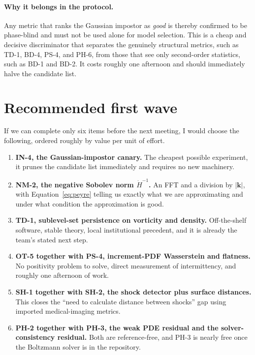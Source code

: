 \documentclass[11pt]{article}
\begin{document}
\paragraph{Why it belongs in the protocol.} Any metric that ranks the Gaussian impostor as
\emph{good} is thereby confirmed to be phase-blind and must not be used alone for model
selection. This is a cheap and decisive discriminator that separates the genuinely structural
metrics, such as TD-1, BD-4, PS-4, and PH-6, from those that see only second-order
statistics, such as BD-1 and BD-2. It costs roughly one afternoon and should immediately
halve the candidate list.

\section{Recommended first wave}

If we can complete only six items before the next meeting, I would choose the following,
ordered roughly by value per unit of effort.

\begin{enumerate}[leftmargin=*]
\item \textbf{IN-4, the Gaussian-impostor canary.} The cheapest possible experiment, it
prunes the candidate list immediately and requires no new machinery.
\item \textbf{NM-2, the negative Sobolev norm $\dot H^{-1}$.} An FFT and a division by
$|\mathbf{k}|$, with Equation~\eqref{eq:peyre} telling us exactly what we are approximating
and under what condition the approximation is good.
\item \textbf{TD-1, sublevel-set persistence on vorticity and density.} Off-the-shelf
software, stable theory, local institutional precedent, and it is already the team's stated
next step.
\item \textbf{OT-5 together with PS-4, increment-PDF Wasserstein and flatness.} No positivity
problem to solve, direct measurement of intermittency, and roughly one afternoon of work.
\item \textbf{SH-1 together with SH-2, the shock detector plus surface distances.} This
closes the ``need to calculate distance between shocks'' gap using imported medical-imaging
metrics.
\item \textbf{PH-2 together with PH-3, the weak PDE residual and the solver-consistency
residual.} Both are reference-free, and PH-3 is nearly free once the Boltzmann solver is in
the repository.
\end{enumerate}
\end{document}
